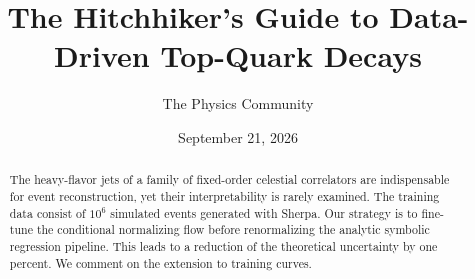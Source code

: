 \documentclass[11pt]{article}
\title{The Hitchhiker's Guide to Data-Driven Top-Quark Decays}
\author{The Physics Community}
\date{September 21, 2026}
\begin{document}
\maketitle
\begin{abstract}
The heavy-flavor jets of a family of fixed-order celestial correlators
are indispensable for event reconstruction, yet their interpretability
is rarely examined. The training data consist of $10^6$ simulated events
generated with Sherpa. Our strategy is to fine-tune the conditional
normalizing flow before renormalizing the analytic symbolic regression
pipeline. This leads to a reduction of the theoretical uncertainty by
one percent. We comment on the extension to training curves.
\end{abstract}
\tableofcontents




\nocite{*}


\end{document}
